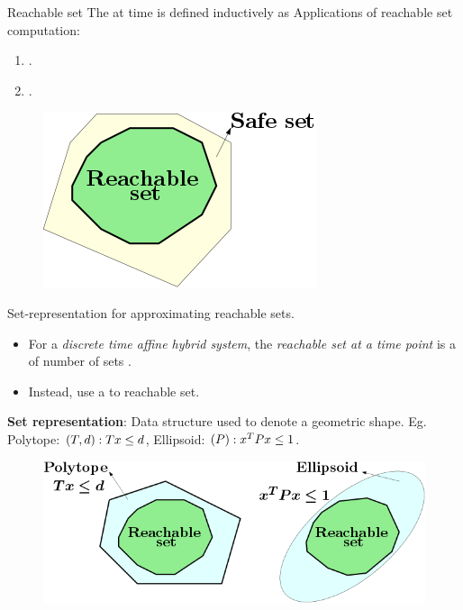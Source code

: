 %
\begin{frame}{Reachable set}
The  at time  is defined inductively as
%
\eqncol{
\[
\reachset{t}=\bigcup_{x\in\reachset{t-1},u\in\inputset}f\lt(x,u\rt).
\]
}
%
{Applications} of reachable set computation:
%
\begin{enumerate}
\item {}.
\item {}.~\cite{todo}
\end{enumerate}
%
\begin{figure}
\includegraphics[scale=0.4]{figures/safety.png}
\end{figure}
%
\end{frame}
%

\begin{frame}{Set-representation for approximating reachable sets}.
\begin{itemize}
\item For a \emph{discrete time affine hybrid system}, the \emph{reachable set at a
time point} is a  of number of sets .\pause
\item Instead, use a  to
 reachable set.\pause
\end{itemize}
%
\begin{alertblock}{}
{\bf Set representation}: {\color{blue} Data structure} used to denote
a {\color{blue} geometric shape}.  Eg. {\color{purple} Polytope}: $\left(T,d\right): Tx\leq d$,
{\color{purple} Ellipsoid}: $\left(P\right): x^TPx\leq 1$.
\end{alertblock}
%
\begin{figure}
\includegraphics[scale=0.35]{figures/set-representation.png}
\end{figure}
%
\end{frame}

